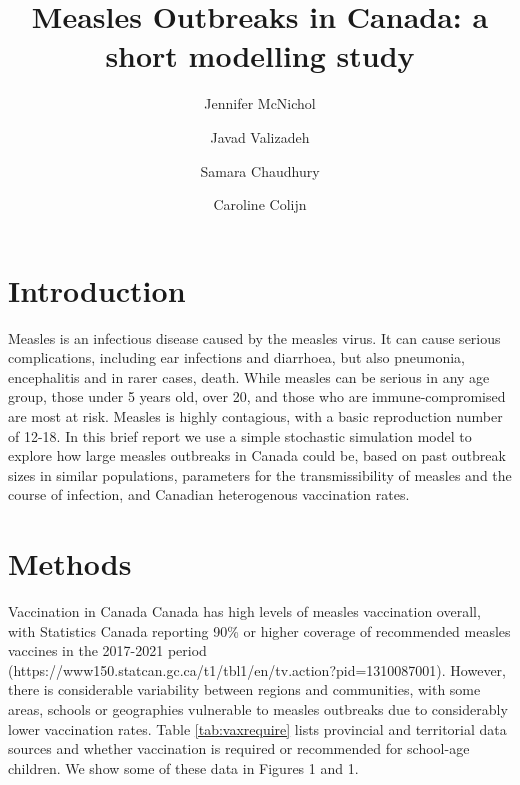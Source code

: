 \documentclass[12pt,a4paper]{article}
\begin{document}
\title{Measles Outbreaks in Canada: a short modelling study
}


\author[1]{Jennifer McNichol}
\author[1]{Javad Valizadeh}
\author[1]{Samara Chaudhury}
\author[1,*]{Caroline Colijn}


\maketitle

\section{Introduction}

Measles is an infectious disease caused by the measles virus. It can cause serious complications, including ear infections and diarrhoea, but also pneumonia, encephalitis and in rarer cases, death. While measles can be serious in any age group, those under 5 years old, over 20, and those who are immune-compromised are most at risk. Measles is highly contagious, with a basic reproduction number of 12-18.
In this brief report we use a simple stochastic simulation model to explore how large measles outbreaks in Canada could be, based on past outbreak sizes in similar populations, parameters for the transmissibility of measles and the course of infection, and Canadian heterogenous vaccination rates.

\section{Methods}
Vaccination in Canada
Canada has high levels of measles vaccination overall, with Statistics Canada reporting 90\% or higher coverage of recommended measles vaccines in the 2017-2021 period (https://www150.statcan.gc.ca/t1/tbl1/en/tv.action?pid=1310087001). However, there is considerable variability between regions and communities, with some areas, schools or geographies vulnerable to measles outbreaks due to considerably lower vaccination rates. Table \ref{tab:vaxrequire} lists provincial and territorial data sources and whether vaccination is required or recommended for school-age children. We show some of these data in Figures 1 and 1.
\end{document}
